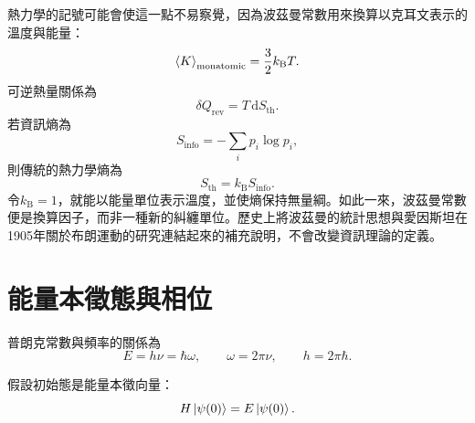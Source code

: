 熱力學的記號可能會使這一點不易察覺，因為波茲曼常數用來換算以克耳文表示的溫度與能量：
\begin{equation}
\left\langle K\right\rangle_{\mathrm{monatomic}}
=\frac32 k_{\mathrm B}T.
\end{equation}
可逆熱量關係為
\begin{equation}
\delta Q_{\mathrm{rev}}=T\,\mathrm dS_{\mathrm{th}}.
\end{equation}
若資訊熵為
\begin{equation}
S_{\mathrm{info}}=-\sum_i p_i\log p_i,
\end{equation}
則傳統的熱力學熵為
\begin{equation}
S_{\mathrm{th}}=k_{\mathrm B}S_{\mathrm{info}}.
\end{equation}
令\(k_{\mathrm B}=1\)，就能以能量單位表示溫度，並使熵保持無量綱。如此一來，波茲曼常數便是換算因子，而非一種新的糾纏單位。歷史上將波茲曼的統計思想與愛因斯坦在1905年關於布朗運動的研究連結起來的補充說明，不會改變資訊理論的定義。

\section{能量本徵態與相位}

\begin{classroomqa}
\end{classroomqa}

普朗克常數與頻率的關係為
\begin{equation}
E=h\nu=\hbar\omega,
\qquad
\omega=2\pi\nu,
\qquad
h=2\pi\hbar.
\end{equation}

\begin{classroomqa}
\end{classroomqa}

假設初始態是能量本徵向量：
\begin{equation}
H\left\lvert\psi(0)\right\rangle=E\left\lvert\psi(0)\right\rangle.
\end{equation}

